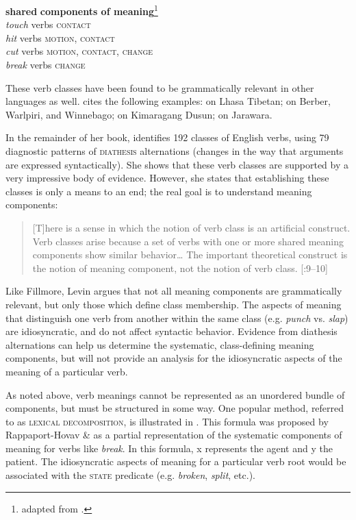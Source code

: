 \ea \label{ex:7.32}
\textbf{shared} \textbf{components of meaning}\footnote{adapted from \citet[268]{Saeed2009}.}\\
\textit{touch} verbs  \textsc{contact}\textit{\\
hit} verbs  \textsc{motion, contact}\textit{\\
cut} verbs  \textsc{motion, contact, change}\textit{\\
break} verbs  \textsc{change}
\z


These verb classes have been found to be grammatically relevant in other languages as well. \citet{Levin2015} cites the following examples: \citet{DeLancey1995,DeLancey2000} on Lhasa Tibetan; \citet{GuersselEtAl1985} on Berber, Warlpiri, and Winnebago; \citet{Kroeger2010} on Kimaragang Dusun; \citet{Vogel2005} on Jarawara.

In the remainder of her book, \citet{Levin1993} identifies 192 classes of English verbs, using 79 diagnostic patterns of \textsc{diathesis} alternations (changes in the way that arguments are expressed syntactically). She shows that these verb classes are supported by a very impressive body of evidence. However, she states that establishing these classes is only a means to an end; the real goal is to understand meaning components:


\begin{quote}
{}[T]here is a sense in which the notion of verb class is an artificial construct. Verb classes arise because a set of verbs with one or more shared meaning components show similar behavior… The important theoretical construct is the notion of meaning component, not the notion of verb class. [\citealt{Levin1993}:9–10]
\end{quote}


Like Fillmore, Levin argues that not all meaning components are grammatically relevant, but only those which define class membership. The aspects of meaning that distinguish one verb from another within the same class (e.g. \textit{punch} vs. \textit{slap}) are idiosyncratic, and do not affect syntactic behavior. Evidence from diathesis alternations can help us determine the systematic, class-defining meaning components, but will not provide an analysis for the idiosyncratic aspects of the meaning of a particular verb.

As noted above, verb meanings cannot be represented as an unordered bundle of components, but must be structured in some way. One popular method, referred to as \textsc{lexical decomposition}, is illustrated in . This formula was proposed by Rappaport-Hovav \& \citet[109]{Levin1998} as a partial representation of the systematic components of meaning for verbs like \textit{break}. In this formula, x represents the agent and y the patient. The idiosyncratic aspects of meaning for a particular verb root would be associated with the \textsc{state} predicate (e.g. \textit{broken}, \textit{split}, etc.).


